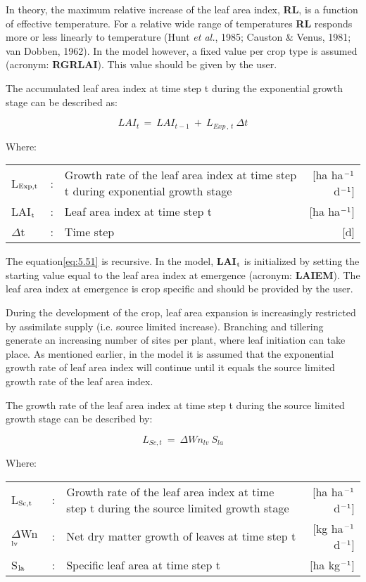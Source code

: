 In theory, the maximum relative increase of the leaf area index, {\bf RL}, is a function of
effective temperature. For a relative wide range of temperatures {\bf RL} responds more or
less linearly to temperature (Hunt {\it et al.}, 1985; Causton \& Venus, 1981; van Dobben,
1962). In the model however, a fixed value per crop type is assumed (acronym: 
{\bf RGRLAI}). This value should be given by the user.

The accumulated leaf area index at time step t during the exponential growth stage can be
described as:

\begin{equation}
\label{eq:5.51}
LAI _{t~} =~LAI _{t-1} ~+~L _{Exp\, ,\, t} ~\Delta t
\end{equation}

Where:\\[5pt]
\begin{tabularx}{\textwidth}{llXr}
	L$_{{\rm Exp,t}}$ &:& Growth rate of the leaf area index at time step t
	during exponential growth stage    &    [ha ha$^{{\rm -1}}$ d$^{{\rm -1}}$]\\
	LAI$_{{\rm t}}$ &:& Leaf area index at time step t   &
	[ha ha$^{{\rm -1}}$]\\
	$\Delta$t &:& Time step   &    [d]
\end{tabularx}

The equation\ref{eq:5.51} is recursive. In the model, {\bf LAI$_{{\rm t}}$} is initialized by 
setting the starting
value equal to the leaf area index at emergence (acronym: {\bf LAIEM}). The leaf area index
at emergence is crop specific and should be provided by the user.

During the development of the crop, leaf area expansion is increasingly restricted by
assimilate supply (i.e. source limited increase). Branching and tillering generate an
increasing number of sites per plant, where leaf initiation can take place. As mentioned
earlier, in the model it is assumed that the exponential growth rate of leaf area index will
continue until it equals the source limited growth rate of the leaf area index.

The growth rate of the leaf area index at time step t during the source limited growth 
stage can be described by:

\begin{equation}
\label{eq:5.52}
L _{Sc,t} ~=~\Delta Wn _{lv} ~S _{la} 
\end{equation}

Where:\\[5pt]
\begin{tabularx}{\textwidth}{llXr}
	L$_{{\rm Sc,t}}$ &:& Growth rate of the leaf area index at time step t
	during the source limited growth stage    &
	[ha ha$^{{\rm -1}}$ d$^{{\rm -1}}$]\\
	$\Delta$Wn$_{{\rm lv}}$ &:& Net dry matter growth of leaves at time step t    &
	[kg ha$^{{\rm -1}}$ d$^{{\rm -1}}$]\\
	S$_{{\rm la}}$ &:& Specific leaf area at time step t   &
	[ha kg$^{{\rm -1}}$]\\
\end{tabularx}

